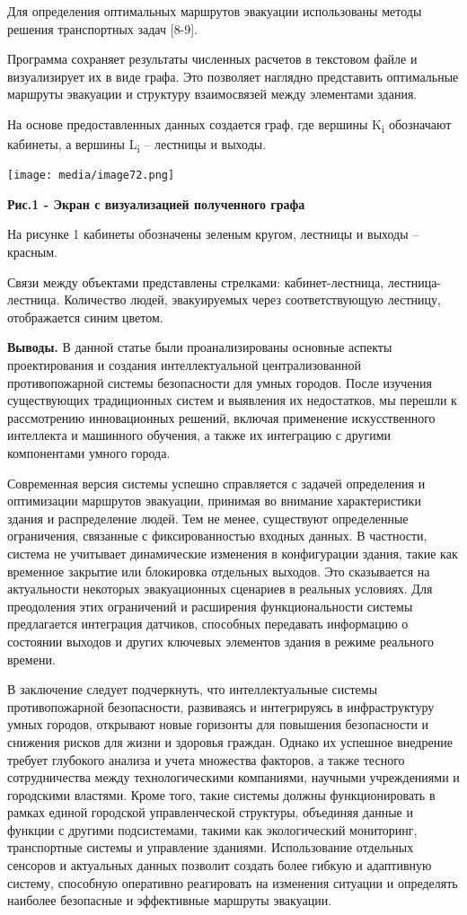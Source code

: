 \documentclass[
]{article}
\begin{document}
Для определения оптимальных маршрутов эвакуации использованы методы
решения транспортных задач {[}8-9{]}.

Программа сохраняет результаты численных расчетов в текстовом файле и
визуализирует их в виде графа. Это позволяет наглядно представить
оптимальные маршруты эвакуации и структуру взаимосвязей между элементами
здания.

На основе предоставленных данных создается граф, где вершины
K\textsubscript{i} обозначают кабинеты, а вершины L\textsubscript{i} --
лестницы и выходы.

\texttt{[image: media/image72.png]}

\textbf{Рис.1 - Экран с визуализацией полученного графа}

На рисунке 1 кабинеты обозначены зеленым кругом, лестницы и выходы --
красным.

Связи между объектами представлены стрелками: кабинет-лестница,
лестница-лестница. Количество людей, эвакуируемых через соответствующую
лестницу, отображается синим цветом.

\textbf{Выводы.} В данной статье были проанализированы основные аспекты
проектирования и создания интеллектуальной централизованной
противопожарной системы безопасности для умных городов. После изучения
существующих традиционных систем и выявления их недостатков, мы перешли
к рассмотрению инновационных решений, включая применение искусственного
интеллекта и машинного обучения, а также их интеграцию с другими
компонентами умного города.

Современная версия системы успешно справляется с задачей определения и
оптимизации маршрутов эвакуации, принимая во внимание характеристики
здания и распределение людей. Тем не менее, существуют определенные
ограничения, связанные с фиксированностью входных данных. В частности,
система не учитывает динамические изменения в конфигурации здания, такие
как временное закрытие или блокировка отдельных выходов. Это сказывается
на актуальности некоторых эвакуационных сценариев в реальных условиях.
Для преодоления этих ограничений и расширения функциональности системы
предлагается интеграция датчиков, способных передавать информацию о
состоянии выходов и других ключевых элементов здания в режиме реального
времени.

В заключение следует подчеркнуть, что интеллектуальные системы
противопожарной безопасности, развиваясь и интегрируясь в инфраструктуру
умных городов, открывают новые горизонты для повышения безопасности и
снижения рисков для жизни и здоровья граждан. Однако их успешное
внедрение требует глубокого анализа и учета множества факторов, а также
тесного сотрудничества между технологическими компаниями, научными
учреждениями и городскими властями. Кроме того, такие системы должны
функционировать в рамках единой городской управленческой структуры,
объединяя данные и функции с другими подсистемами, такими как
экологический мониторинг, транспортные системы и управление зданиями.
Использование отдельных сенсоров и актуальных данных позволит создать
более гибкую и адаптивную систему, способную оперативно реагировать на
изменения ситуации и определять наиболее безопасные и эффективные
маршруты эвакуации.
\end{document}
